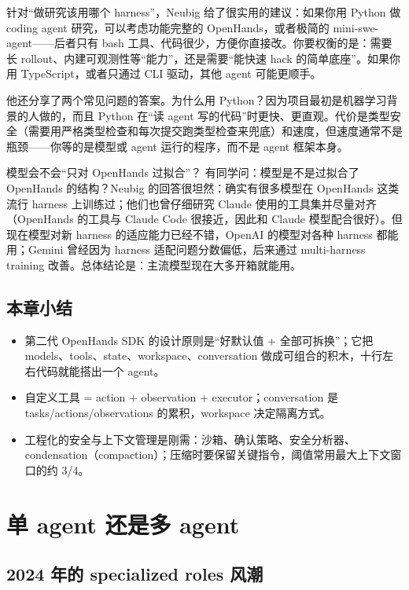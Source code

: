 \documentclass[a4paper]{article}
\begin{document}
针对“做研究该用哪个 harness”，Neubig 给了很实用的建议：如果你用 Python 做 coding agent 研究，可以考虑功能完整的 OpenHands，或者极简的 mini-swe-agent——后者只有 bash 工具、代码很少，方便你直接改。你要权衡的是：需要长 rollout、内建可观测性等“能力”，还是需要“能快速 hack 的简单底座”。如果你用 TypeScript，或者只通过 CLI 驱动，其他 agent 可能更顺手。

他还分享了两个常见问题的答案。为什么用 Python？因为项目最初是机器学习背景的人做的，而且 Python 在“读 agent 写的代码”时更快、更直观。代价是类型安全（需要用严格类型检查和每次提交跑类型检查来兜底）和速度，但速度通常不是瓶颈——你等的是模型或 agent 运行的程序，而不是 agent 框架本身。

\begin{knowledgebox}{模型会不会“只对 OpenHands 过拟合”？}
有同学问：模型是不是过拟合了 OpenHands 的结构？Neubig 的回答很坦然：确实有很多模型在 OpenHands 这类流行 harness 上训练过；他们也曾仔细研究 Claude 使用的工具集并尽量对齐（OpenHands 的工具与 Claude Code 很接近，因此和 Claude 模型配合很好）。但现在模型对新 harness 的适应能力已经不错，OpenAI 的模型对各种 harness 都能用；Gemini 曾经因为 harness 适配问题分数偏低，后来通过 multi-harness training 改善。总体结论是：主流模型现在大多开箱就能用。
\end{knowledgebox}

\subsection{本章小结}

\begin{itemize}
\item 第二代 OpenHands SDK 的设计原则是“好默认值 + 全部可拆换”；它把 models、tools、state、workspace、conversation 做成可组合的积木，十行左右代码就能搭出一个 agent。
\item 自定义工具 = action + observation + executor；conversation 是 tasks/actions/observations 的累积，workspace 决定隔离方式。
\item 工程化的安全与上下文管理是刚需：沙箱、确认策略、安全分析器、condensation（compaction）；压缩时要保留关键指令，阈值常用最大上下文窗口的约 3/4。
\end{itemize}

\section{单 agent 还是多 agent}

\subsection{2024 年的 specialized roles 风潮}
\end{document}
